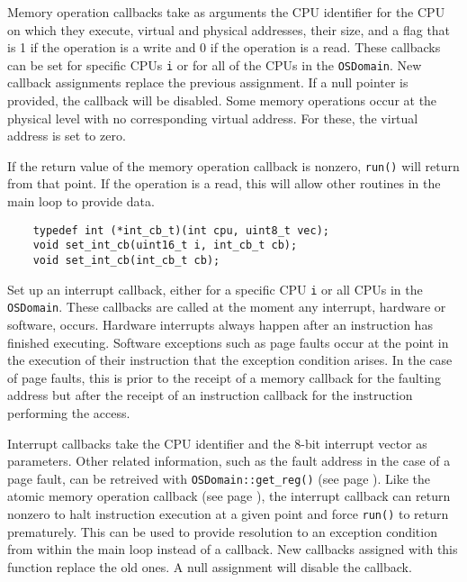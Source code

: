 \documentclass[letterpaper, 10pt]{book}
\begin{document}
Memory operation callbacks take as arguments the CPU identifier for the CPU
on which they execute, virtual and physical addresses, their size, and a flag
that is 1 if the operation is a write and 0 if the operation is a read. These
callbacks can be set for specific CPUs \texttt{i} or for all of the CPUs in the
\texttt{OSDomain}. New callback assignments replace the previous assignment. If
a null pointer is provided, the callback will be disabled. Some memory
operations occur at the physical level with no corresponding virtual address.
For these, the virtual address is set to zero.

If the return value of the memory operation callback is nonzero, \texttt{run()}
will return from that point. If the operation is a read, this will allow other
routines in the main loop to provide data.

\label{func:set_int_cb} \begin{verbatim}
    typedef int (*int_cb_t)(int cpu, uint8_t vec);
    void set_int_cb(uint16_t i, int_cb_t cb);
    void set_int_cb(int_cb_t cb);
\end{verbatim}
Set up an interrupt callback, either for a specific CPU \texttt{i} or all CPUs
in the \texttt{OSDomain}. These callbacks are called at the moment any
interrupt, hardware or software, occurs. Hardware interrupts always happen
after an instruction has finished executing. Software exceptions such as page
faults occur at the point in the execution of their instruction that the
exception condition arises. In the case of page faults, this is prior to the
receipt of a memory callback for the faulting address but after the receipt of
an instruction callback for the instruction performing the access.

Interrupt callbacks take the CPU identifier and the 8-bit interrupt vector as
parameters. Other related information, such as the fault address in the case of
a page fault, can be retreived with \texttt{OSDomain::get\_reg()} (see page 
\pageref{func:get_reg}).  Like the atomic memory operation callback (see page 
\pageref{func:set_atomic_cb}), the interrupt callback can return nonzero to
halt instruction execution at a given point and force \texttt{run()} to return
prematurely. This can be used to provide resolution to an exception condition
from within the main loop instead of a callback. New callbacks
assigned with this function replace the old ones. A null assignment will
disable the callback.
\end{document}
